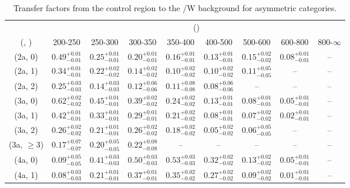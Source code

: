 \begin{table}[h!]
\tiny
\centering
\caption{Transfer factors from the \mj control region to the \ttbar/W background for asymmetric categories.\label{tab:tf_mu_ttw_asym}}
\begin{tabular}
{ccccccccc}
	\hline\hline
	& \multicolumn{8}{c}{\scalht (\gev)} \\ 
	 (\njet,  \nb) & 200-250 & 250-300 & 300-350 & 350-400 & 400-500 & 500-600 & 600-800 & 800-$\infty$ \\ [0.8ex] 
\hline
	(2a, 0) & $0.49^{+ 0.01 }_{- 0.01 }$ & $0.25^{+ 0.01 }_{- 0.01 }$ & $0.20^{+ 0.01 }_{- 0.01 }$ & $0.16^{+ 0.01 }_{- 0.01 }$ & $0.13^{+ 0.01 }_{- 0.01 }$ & $0.15^{+ 0.02 }_{- 0.02 }$ & $0.08^{+ 0.01 }_{- 0.01 }$ & -- \\[0.5ex] 
	(2a, 1) & $0.34^{+ 0.01 }_{- 0.01 }$ & $0.22^{+ 0.02 }_{- 0.02 }$ & $0.14^{+ 0.02 }_{- 0.02 }$ & $0.10^{+ 0.02 }_{- 0.02 }$ & $0.10^{+ 0.02 }_{- 0.02 }$ & $0.11^{+ 0.05 }_{- 0.05 }$ & -- & -- \\[0.5ex] 
	(2a, 2) & $0.25^{+ 0.03 }_{- 0.03 }$ & $0.14^{+ 0.03 }_{- 0.03 }$ & $0.12^{+ 0.06 }_{- 0.06 }$ & $0.11^{+ 0.08 }_{- 0.08 }$ & $0.08^{+ 0.06 }_{- 0.06 }$ & -- & -- & -- \\[0.5ex] 
	(3a, 0) & $0.62^{+ 0.02 }_{- 0.02 }$ & $0.45^{+ 0.01 }_{- 0.01 }$ & $0.39^{+ 0.02 }_{- 0.02 }$ & $0.24^{+ 0.02 }_{- 0.02 }$ & $0.13^{+ 0.01 }_{- 0.01 }$ & $0.08^{+ 0.01 }_{- 0.01 }$ & $0.05^{+ 0.01 }_{- 0.01 }$ & -- \\[0.5ex] 
	(3a, 1) & $0.42^{+ 0.01 }_{- 0.01 }$ & $0.33^{+ 0.01 }_{- 0.01 }$ & $0.29^{+ 0.01 }_{- 0.01 }$ & $0.21^{+ 0.02 }_{- 0.02 }$ & $0.08^{+ 0.01 }_{- 0.01 }$ & $0.07^{+ 0.02 }_{- 0.02 }$ & $0.02^{+ 0.01 }_{- 0.01 }$ & -- \\[0.5ex] 
	(3a, 2) & $0.26^{+ 0.02 }_{- 0.02 }$ & $0.21^{+ 0.01 }_{- 0.01 }$ & $0.26^{+ 0.02 }_{- 0.02 }$ & $0.18^{+ 0.02 }_{- 0.02 }$ & $0.05^{+ 0.02 }_{- 0.02 }$ & $0.06^{+ 0.05 }_{- 0.05 }$ & -- & -- \\[0.5ex] 
	(3a, $\ge3$) & $0.17^{+ 0.07 }_{- 0.07 }$ & $0.20^{+ 0.05 }_{- 0.05 }$ & $0.22^{+ 0.08 }_{- 0.08 }$ & -- & -- & -- & -- & -- \\[0.5ex] 
	(4a, 0) & $0.09^{+ 0.05 }_{- 0.05 }$ & $0.41^{+ 0.03 }_{- 0.03 }$ & $0.50^{+ 0.03 }_{- 0.03 }$ & $0.53^{+ 0.03 }_{- 0.03 }$ & $0.32^{+ 0.02 }_{- 0.02 }$ & $0.13^{+ 0.02 }_{- 0.02 }$ & $0.05^{+ 0.01 }_{- 0.01 }$ & -- \\[0.5ex] 
	(4a, 1) & $0.08^{+ 0.03 }_{- 0.03 }$ & $0.21^{+ 0.01 }_{- 0.01 }$ & $0.37^{+ 0.01 }_{- 0.01 }$ & $0.35^{+ 0.02 }_{- 0.02 }$ & $0.27^{+ 0.02 }_{- 0.02 }$ & $0.09^{+ 0.02 }_{- 0.02 }$ & $0.01^{+ 0.01 }_{- 0.01 }$ & -- \\[0.5ex] 

\end{tabular}
\end{table}
